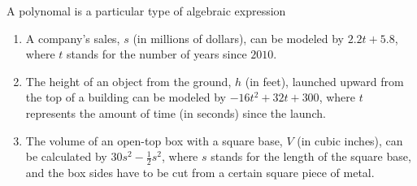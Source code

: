 \documentclass{ximera}
\begin{document}
A polynomal is a particular type of algebraic expression
\begin{enumerate}
\item       A company's sales, $s$
            (in millions of dollars),
            can be modeled by $2.2t+5.8$,
            where $t$ stands for the number of years since $2010$.
\item     The height of an object from the ground, $h$
            (in feet),
            launched upward from the top of a building can be modeled by $-16t^2+32t+300$,
            where $t$ represents the amount of time
            (in seconds)
            since the launch.
 \item The volume of an open-top box with a square base, $V$
            (in cubic inches),
            can be calculated by $30s^2-\frac{1}{2}s^2$,
            where $s$ stands for the length of the square base,
            and the box sides have to be cut from a certain square piece of metal.
\end{enumerate}
\end{document}
